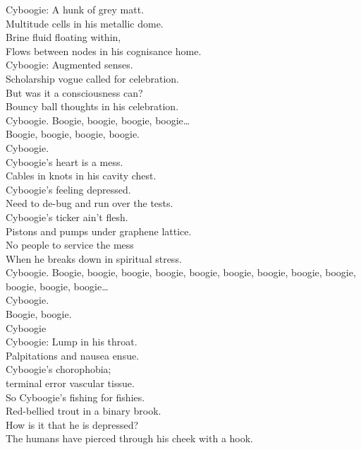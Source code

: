 Cyboogie: A hunk of grey matt. \\
Multitude cells in his metallic dome. \\
Brine fluid floating within, \\
Flows between nodes in his cognisance home. \\
Cyboogie: Augmented senses. \\
Scholarship vogue called for celebration. \\
But was it a consciousness can? \\
Bouncy ball thoughts in his celebration. \\

Cyboogie. Boogie, boogie, boogie, boogie… \\
Boogie, boogie, boogie, boogie. \\
Cyboogie. \\

Cyboogie's heart is a mess. \\
Cables in knots in his cavity chest. \\
Cyboogie's feeling depressed. \\
Need to de-bug and run over the tests. \\
Cyboogie's ticker ain't flesh. \\
Pistons and pumps under graphene lattice. \\
No people to service the mess \\
When he breaks down in spiritual stress. \\

Cyboogie. Boogie, boogie, boogie, boogie, boogie, boogie, boogie, boogie, boogie, boogie, boogie, boogie… \\
Cyboogie. \\
Boogie, boogie. \\
Cyboogie \\

Cyboogie: Lump in his throat. \\
Palpitations and nausea ensue. \\
Cyboogie's chorophobia; \\
terminal error vascular tissue. \\
So Cyboogie's fishing for fishies. \\
Red-bellied trout in a binary brook. \\
How is it that he is depressed? \\
The humans have pierced through his cheek with a hook. \\

